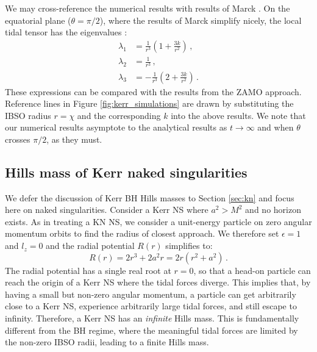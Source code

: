 \documentclass[
    reprint,
    prd,
    nofootinbib,
    amsmath,amssymb,
    aps,
    floatfix,
]{revtex4-2}
\begin{document}
We may cross-reference the numerical results with results of Marck \cite{Marck1983}. On the equatorial plane ($\theta = \pi/2$), where the results of Marck simplify nicely, the local tidal tensor has the eigenvalues \cite{Kesden2012}:
\begin{equation}
    \begin{split}
        \lambda_{1} &= \frac{1}{r^{3}} \left( 1 + \frac{3k}{r^{2}} \right) \, , \\
        \lambda_{2} &= \frac{1}{r^{3}} \, , \\
        \lambda_{3} &= -\frac{1}{r^{3}} \left( 2 + \frac{3k}{r^{2}} \right) \, .
    \end{split}
\end{equation}
These expressions can be compared with the results from the ZAMO approach. Reference lines in Figure \ref{fig:kerr_simulations} are drawn by substituting the IBSO radius $r=\chi$ and the corresponding $k$ into the above results. We note that our numerical results asymptote to the analytical results as $t\to \infty$ and when $\theta$ crosses $\pi/2$, as they must. 




\subsection{Hills mass of Kerr naked singularities}


We defer the discussion of Kerr BH Hills masses to Section \ref{sec:kn} and focus here on naked singularities. Consider a Kerr NS where $a^{2} > M^{2}$ and no horizon exists. As in treating a KN NS, we consider a unit-energy particle on zero angular momentum orbits to find the radius of closest approach. We therefore set $\epsilon = 1$ and $l_{z} = 0$ and the radial potential $R(r)$ simplifies to:
\begin{equation}
    R(r) = 2r^{3} + 2a^{2}r = 2r(r^{2} + a^{2}) \, .
\end{equation}
The radial potential has a single real root at $r = 0$, so that a head-on particle can reach the origin of a Kerr NS where the tidal forces diverge. This implies that, by having a small but non-zero angular momentum, a particle can get arbitrarily close to a Kerr NS, experience arbitrarily large tidal forces, and still escape to infinity. Therefore, a Kerr NS has an \textit{infinite} Hills mass. This is fundamentally different from the BH regime, where the meaningful tidal forces are limited by the non-zero IBSO radii, leading to a finite Hills mass. 
\end{document}
